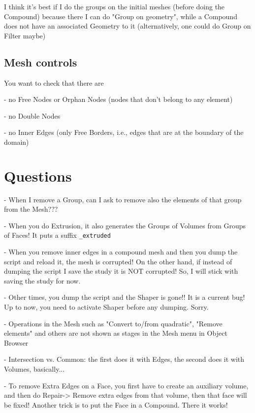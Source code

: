 \documentclass[10pt]{book}
\begin{document}
 I think it's best if I do the groups on the initial meshes (before doing the Compound)
  because there I can do "Group on geometry",
while a Compound does not have an associated Geometry to it
 (alternatively, one could do Group on Filter maybe)

 \section{Mesh controls}
 
  You want to check that there are 
  
  - no Free Nodes or Orphan Nodes (nodes that don't belong to any element)
  
  - no Double Nodes
  
  - no Inner Edges (only Free Borders, i.e., edges that are at the boundary of the domain)
  
  

 

 \chapter{Questions}


- When I remove a Group, can I ask to remove also the elements of that group from the Mesh???

- When you do Extrusion, it also generates the Groups of Volumes from Groups of Faces! It puts a suffix \verb|_extruded|

- When you remove inner edges in a compound mesh and then you dump the script and reload it, the mesh is corrupted! 
On the other hand, if instead of dumping the script I save the study it is NOT corrupted! So, I will stick with saving the study for now.

- Other times, you dump the script and the Shaper is gone!! It is a current bug! Up to now, you need to activate Shaper before any dumping. Sorry.

- Operations in the Mesh such as "Convert to/from quadratic", "Remove elements" and others
  are not shown as stages in the Mesh menu in Object Browser

- Intersection vs. Common: the first does it with Edges, the second does it with Volumes, basically...

- To remove Extra Edges on a Face, you first have to create an auxiliary volume, and then do Repair-> Remove extra edges from that volume,
  then that face will be fixed!
  Another trick is to put the Face in a Compound. There it works!
\end{document}

